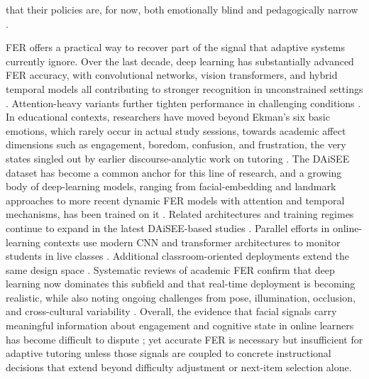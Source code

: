 that their policies are, for now, both emotionally blind and pedagogically narrow \cite{axak_adaptive_2025,guzman_developing_2025}.

\ac{FER} offers a practical way to recover part of the signal that adaptive systems currently ignore. Over the last decade, deep learning has substantially advanced \ac{FER} accuracy, with convolutional networks, vision transformers, and hybrid temporal models all contributing to stronger recognition in unconstrained settings \cite{lek_academic_2023,liu_dynamic_2026,aly_revolutionizing_2025}. Attention-heavy variants further tighten performance in challenging conditions \cite{aly_comprehensive_2025}. In educational contexts, researchers have moved beyond Ekman's six basic emotions, which rarely occur in actual study sessions, towards academic affect dimensions such as engagement, boredom, confusion, and frustration, the very states singled out by earlier discourse-analytic work on tutoring \cite{leong_deep_2020,dmello_language_2012}. The \ac{DAiSEE} dataset has become a common anchor for this line of research, and a growing body of deep-learning models, ranging from facial-embedding and landmark approaches to more recent dynamic \ac{FER} models with attention and temporal mechanisms, has been trained on it \cite{leong_deep_2020,asaju_adaptive_2022,mehta_three-dimensional_2022}. Related architectures and training regimes continue to expand in the latest \ac{DAiSEE}-based studies \cite{komaravalli_detecting_2023,liu_dynamic_2026,rao_recognition_2021}. Parallel efforts in online-learning contexts use modern \ac{CNN} and transformer architectures to monitor students in live classes \cite{aly_revolutionizing_2025,aly_enhancing_2023}. Additional classroom-oriented deployments extend the same design space \cite{aly_comprehensive_2025,gupta_edfa_2023}. Systematic reviews of academic \ac{FER} confirm that deep learning now dominates this subfield and that real-time deployment is becoming realistic, while also noting ongoing challenges from pose, illumination, occlusion, and cross-cultural variability \cite{lek_academic_2023,fernandez-herrero_evaluating_2024}. Overall, the evidence that facial signals carry meaningful information about engagement and cognitive state in online learners has become difficult to dispute \cite{mehta_three-dimensional_2022,gupta_edfa_2023,woolf_face_2023}; yet accurate \ac{FER} is necessary but insufficient for adaptive tutoring unless those signals are coupled to concrete instructional decisions that extend beyond difficulty adjustment or next-item selection alone.

